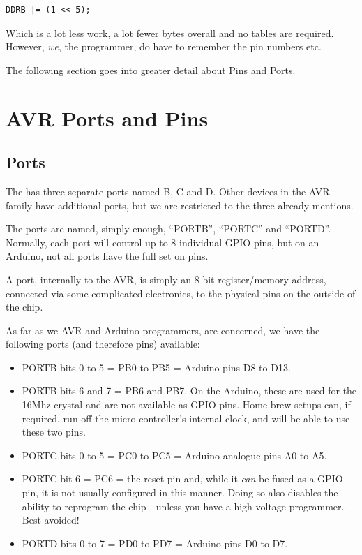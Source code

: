 \begin{lstlisting}[numbers={none}]
	DDRB |= (1 << 5);
\end{lstlisting}

Which is a lot less work, a lot fewer bytes overall and no tables are required. However, \emph{we}, the programmer, do have to remember the pin numbers etc.

The following section goes into greater detail about Pins and Ports.

\section{AVR Ports and Pins}\label{avr-ports-and-pins}

\subsection{Ports}\label{avr-ports}

The  has three separate ports named B, C and D. Other devices in the AVR family have additional ports, but we are restricted to the three already mentions.

The ports are named, simply enough, ``PORTB'', ``PORTC'' and ``PORTD''. Normally, each port will control up to 8 individual GPIO  pins, but on an Arduino, not all ports have the full set on pins.

A port, internally to the AVR, is simply an 8 bit register/memory address, connected via some complicated electronics, to the physical pins on the outside of the chip.

As far as we AVR and Arduino programmers, are concerned, we have the following ports (and therefore pins) available:

\begin{itemize}
	\item PORTB bits 0 to 5 = PB0 to PB5 = Arduino pins D8 to D13.
	\item PORTB bits 6 and 7 = PB6 and PB7. On the Arduino, these are used for the 16Mhz crystal and are not available as GPIO pins. Home brew setups can, if required, run off the micro controller's internal clock, and will be able to use these two pins.
	\item PORTC bits 0 to 5 = PC0 to PC5 = Arduino analogue pins A0 to A5.
	\item PORTC bit 6 = PC6 = the reset pin and, while it \emph{can} be fused as a GPIO pin, it is not usually configured in this manner. Doing so also disables the ability to reprogram the chip - unless you have a high voltage programmer. Best avoided!
	\item PORTD bits 0 to 7 = PD0 to PD7 = Arduino pins D0 to D7.
\end{itemize}

